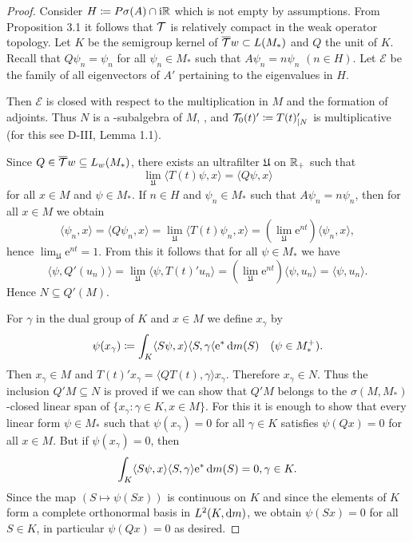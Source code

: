 \begin{proof}
Consider $H \coloneqq P\sigma(A) \cap \mathrm{i}\mathbb{R}$ which is not empty by assumptions.
From Proposition 3.1 it follows that $\mathcal{T}$ is relatively compact in the weak operator topology.
Let $K$ be the semigroup kernel of $\overline{\mathcal{T}}{w} \subset L(M_{*})$ and $Q$ the unit of $K$.
Recall that $Q\psi_{n} = \psi_{n}$ for all $\psi_{n} \in M_{*}$ such that $A\psi_{n} = n\psi_{n}$ $(n \in H)$.
Let $\mathcal{E}$ be the family of all eigenvectors of $A'$ pertaining to the eigenvalues in $H$.

Then $\mathcal{E}$ is closed with respect to the multiplication in $M$ and the formation of adjoints.
Thus $N$ is a \WA-subalgebra of $M$, \citet[Corollary 1.7.9.]{sakai:1971}, and $\mathcal{T}_{0}(t)' \coloneqq T(t)'_{|N}$ is multiplicative (for this see D-III, Lemma 1.1).

Since $Q \in \overline{\mathcal{T}}{w}  \subseteq L_{w}(M_{*})$, there exists an ultrafilter $\mathfrak{U}$ on $\mathbb{R}_{+}$ such that 
%
\[
	\lim_{\mathfrak{U}}\langle T(t)\psi,x\rangle = \langle Q\psi,x\rangle
\]
%
for all $x \in M$ and $\psi \in M_{*}$.
If $n \in H$ and $\psi_{n} \in M_{*}$ such that $A\psi_{n} = n\psi_{n}$, then for all $x \in M$ we obtain
\[
\langle\psi_{n},x\rangle = \langle Q\psi_{n},x\rangle = \lim_{\mathfrak{U}} \langle T(t)\psi_{n},x\rangle = (\lim_{\mathfrak{U}} \mathrm{e}^{nt})\langle\psi_{n},x\rangle,
\]
hence $\lim_{\mathfrak{U}} \mathrm{e}^{nt} = 1$.
From this it follows that for all $\psi \in M_{*}$ we have
\[
\langle\psi,Q'(u_{n})\rangle = \lim_{\mathfrak{U}} \langle\psi,T(t)'u_{n}\rangle = (\lim_{\mathfrak{U}} \mathrm{e}^{nt})\langle\psi,u_{n}\rangle = \langle\psi,u_{n}\rangle.
\]
Hence $N \subseteq Q'(M)$.

For $\gamma$ in the dual group of $K$ and $x \in M$ we define $x_{\gamma}$ by
\[
\psi(x_{\gamma}) \coloneqq \int_{K} \langle S\psi,x\rangle\langle S,\gamma \langle\mathrm{e}^{*} \mathop{}\!\mathrm{d}{m} (S) \quad (\psi \in M_{*}^{+}).
\]
Then $x_{\gamma} \in M$ and $T(t)'x_{\gamma} = \langle QT(t),\gamma\rangle x_{\gamma}$.
Therefore $x_{\gamma} \in N$.
Thus the inclusion $Q'M \subseteq N$ is proved if we can show that $Q'M$ belongs to the $\sigma(M,M_{*})$-closed linear span of $\{x_{\gamma} \colon \gamma \in K, x \in M\}$.
For this it is enough to show that every linear form $\psi \in M_{*}$ such that $\psi(x_{\gamma}) = 0$ for all $\gamma \in K$ satisfies $\psi(Qx) = 0$ for all $x \in M$.
But if $\psi(x_{\gamma}) = 0$, then
\[
\int_{K} \langle S\psi,x\rangle\langle S,\gamma\rangle\mathrm{e}^{*} \mathop{}\!\mathrm{d}{m} (S) = 0, \gamma \in K.
\]
Since the map $(S \mapsto \psi(Sx))$ is continuous on $K$ and since the elements of $K$ form a complete orthonormal basis in $L^2(K,\mathop{}\!\mathrm{d}{m})$, we obtain $\psi(Sx) = 0$ for all $S \in K$, in particular $\psi(Qx) = 0$ as desired.


\end{proof}
